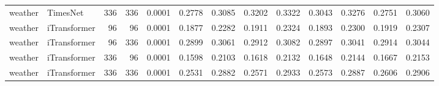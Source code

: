 \begin{longtable}{@{}llrrr*{8}{r}@{}}
weather & TimesNet & 336 & 336 & 0.0001 & 0.2778 & 0.3085 & 0.3202 & 0.3322 & 0.3043 & 0.3276 & 0.2751 & 0.3060 \\
weather & iTransformer & 96 & 96 & 0.0001 & 0.1877 & 0.2282 & 0.1911 & 0.2324 & 0.1893 & 0.2300 & 0.1919 & 0.2307 \\
weather & iTransformer & 96 & 336 & 0.0001 & 0.2899 & 0.3061 & 0.2912 & 0.3082 & 0.2897 & 0.3041 & 0.2914 & 0.3044 \\
weather & iTransformer & 336 & 96 & 0.0001 & 0.1598 & 0.2103 & 0.1618 & 0.2132 & 0.1648 & 0.2144 & 0.1667 & 0.2153 \\
weather & iTransformer & 336 & 336 & 0.0001 & 0.2531 & 0.2882 & 0.2571 & 0.2933 & 0.2573 & 0.2887 & 0.2606 & 0.2906 \\
\end{longtable}

